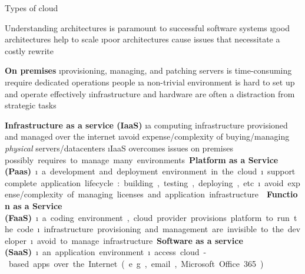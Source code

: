 \begin{frame}[allowframebreaks]{Types of cloud}

Understanding architectures is paramount to successful software systems
\i good architectures help to scale
\i poor architectures cause issues that necessitate a costly rewrite

\textbf{On premises}
\i provisioning, managing, and patching servers is time-consuming
\i require dedicated operations people
\i a non-trivial environment is hard to set up and operate effectively
\i infrastructure and hardware are often a distraction from strategic tasks

\framebreak

\textbf{Infrastructure as a service (IaaS)} 
\i a computing infrastructure provisioned and managed over the internet
\i avoid expense/complexity of buying/managing \textit{physical} servers/datacenters
\i IaaS overcomes issues on premises
\si possibly requires to manage many environments

\textbf{Platform as a Service (Paas)}
\i a development and deployment environment in the cloud
\i support complete application lifecycle: building, testing, deploying, etc.
\i avoid expense/complexity of managing licenses and application infrastructure

\framebreak

\textbf{Function as a Service (FaaS)}
\i a coding environment, cloud provider provisions platform to run the code
\i infrastructure provisioning and management are invisible to the developer
\i avoid to manage infrastructure

\textbf{Software as a service (SaaS)} 
\i an application environment 
\i access cloud-based apps over the Internet (e.g., email, Microsoft Office 365)
\end{frame}

